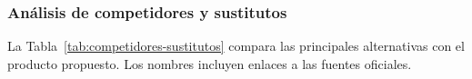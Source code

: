 \subsubsection{Análisis de competidores y sustitutos}




La Tabla~\ref{tab:competidores-sustitutos} compara las principales
alternativas con el producto propuesto. Los nombres incluyen
enlaces a las fuentes oficiales.


